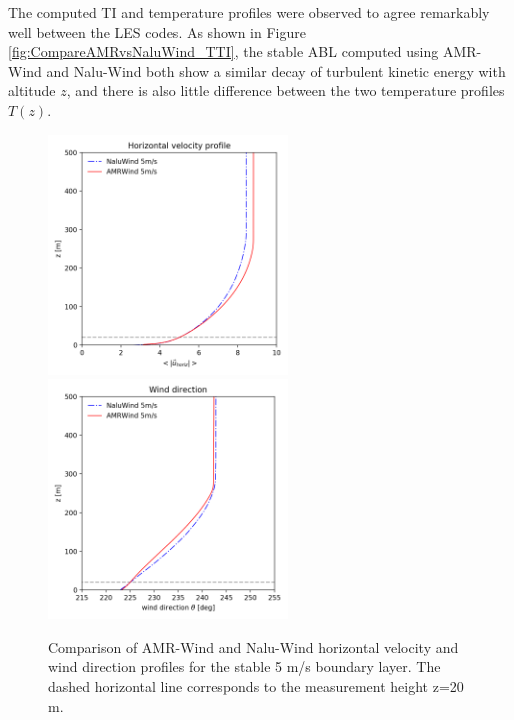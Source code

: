 The computed TI and temperature profiles were observed to agree
remarkably well between the LES codes. As shown in Figure
\ref{fig:CompareAMRvsNaluWind_TTI}, the stable ABL computed using
AMR-Wind and Nalu-Wind both show a similar decay of turbulent kinetic
energy with altitude $z$, and there is also little difference between
the two temperature profiles $T(z)$.

\begin{figure} %
  \centering
  \includegraphics[width=2.5in]{figures/Compare_AMRWind_NaluWind/AMRWind_NaluWind_stable_05ms_mesh2p5_2p5_2p5_WS.png}
  \includegraphics[width=2.5in]{figures/Compare_AMRWind_NaluWind/AMRWind_NaluWind_stable_05ms_mesh2p5_2p5_2p5_Wdir.png}\\
  \caption{\label{fig:CompareAMRvsNaluWind_WSDir} Comparison of
    AMR-Wind and Nalu-Wind horizontal velocity and wind direction
    profiles for the stable 5 m/s boundary layer. The dashed
    horizontal line corresponds to the measurement height z=20 m. }
\end{figure}

